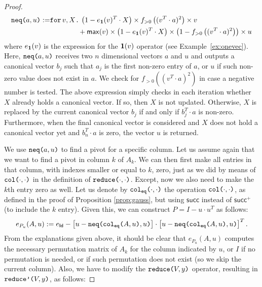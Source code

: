 \begin{proof}
    \begin{align*}
       \texttt{neq(}a,u\texttt{)} := &\texttt{for}\, v,X \texttt{.}\, \left( 1-e_{\mathbf{1}}(v)^T\cdot X \right) \times f_{>0}\left( ( v^T\cdot a )^2 \right)\times v \\
        &\hspace{4em}+ \mathsf{max}(v)\times\left( 1-e_{\mathbf{1}}(v)^T\cdot X \right)\times \left( 1 - f_{>0}\left( ( v^T\cdot a )^2 \right) \right) \times u \\
    \end{align*}
where $e_{\mathbf{1}}(v)$ is the expression for the $\mathbf{1}(v)$ operator (see Example~\ref{ex:onevec}).
Here, $\texttt{neq(}a,u\texttt{)}$ receives two $n$ dimensional vectors $a$ and $u$ and outputs a 
    canonical vector $b_j$ such that $a_j$ is the first non-zero entry of $a$, or $u$ if such non-zero value does not exist in $a$. We check for $f_{>0}((v^T\cdot a)^2)$ 
    in case a negative number is tested. The above expression simply checks in each iteration
    whether $X$ already holds a canonical vector. If so, then $X$ is not updated. Otherwise,
    $X$ is replaced by the current canonical vector $b_j$ if and only if $b_j^T\cdot a$ is non-zero. Furthermore, when the final canonical vector is considered and $X$ does not hold
    a canonical vector yet and $b_n^T\cdot a$ is zero, the vector $u$ is returned.

    We use $\texttt{neq(}a,u\texttt{)}$ to find a pivot for a specific column. Let us assume again that we
    want to find a pivot in column $k$ of $A_k$. We can then first make all entries in that column, with indexes smaller or equal to $k$, zero, just as we did by means of $\texttt{col(}\cdot,\cdot\texttt{)}$ in the
    definition of $\texttt{reduce(}\cdot,\cdot\texttt{)}$. Except, now we also need to make the $k$th entry zero as well.
    Let us denote by $\texttt{col}_{\texttt{eq}}\texttt{(}\cdot,\cdot\texttt{)}$ the operation $\texttt{col(}\cdot,\cdot\texttt{)}$, as defined in the proof of Proposition \ref{prop:gauss}, but using $\mathsf{succ}$ instead of $\mathsf{succ}^+$ (to include the $k$ entry). Given this, we can construct $P=I-u\cdot u^T$ as follows:
    $$
    e_{P_u}(A,u) := e_{\mathsf{Id}} - \left[ u - \texttt{neq(} \texttt{col}_{\texttt{eq}}\texttt{(}A,u\texttt{)} ,u\texttt{)} \right]\cdot \left[ u - \texttt{neq(} \texttt{col}_{\texttt{eq}}\texttt{(}A,u\texttt{)} ,u\texttt{)} \right]^T.
    $$ 
    From the explanations given above, it should be clear that $e_{P_u}(A,u)$ computes the necessary permutation matrix of $A_k$ for the column indicated by $u$, or $I$
    if no permutation is needed, or if such permutation does not exist (so we skip the current column). Also, we have to modify the $\texttt{reduce(}V,y\texttt{)}$ operator, resulting in $\texttt{reduce'(}V,y\texttt{)}$, as follows:


\end{proof}
